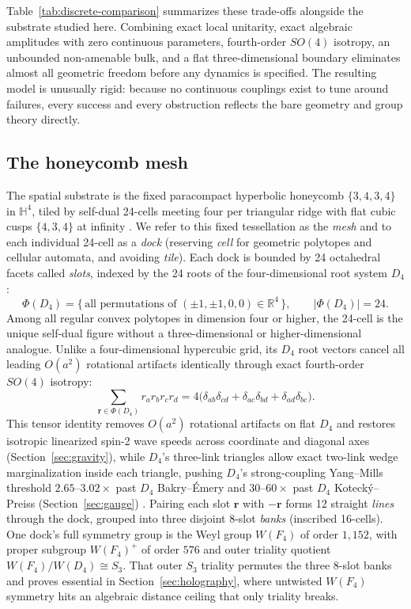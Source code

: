 Table~\ref{tab:discrete-comparison} summarizes these trade-offs alongside the substrate studied here. Combining exact
local unitarity, exact algebraic amplitudes with zero continuous parameters, fourth-order $SO(4)$ isotropy, an
unbounded non-amenable bulk, and a flat three-dimensional boundary eliminates almost all geometric freedom before any
dynamics is specified. The resulting model is unusually rigid: because no continuous couplings exist to tune around
failures, every success and every obstruction reflects the bare geometry and group theory directly.

\subsection{The honeycomb mesh}

The spatial substrate is the fixed paracompact hyperbolic honeycomb $\{3,4,3,4\}$ in $\mathbb{H}^4$, tiled by self-dual
24-cells meeting four per triangular ridge with flat cubic cusps $\{4,3,4\}$ at infinity \cite{coxeter1956,
coxeter1973}. We refer to this fixed tessellation as the \emph{mesh} and to each individual 24-cell as a \emph{dock}
(reserving \emph{cell} for geometric polytopes and cellular automata, and avoiding \emph{tile}). Each dock is bounded by
24 octahedral facets called \emph{slots}, indexed by the 24 roots of the four-dimensional root system $D_4$
\cite{conway1999}:
\begin{equation}
\Phi(D_4) = \bigl\{\,\text{all permutations of } (\pm 1, \pm 1, 0, 0) \in \mathbb{R}^4\,\bigr\},
\qquad
|\Phi(D_4)| = 24.
\label{eq:d4-roots}
\end{equation}
Among all regular convex polytopes in dimension four or higher, the 24-cell is the unique self-dual figure without a
three-dimensional or higher-dimensional analogue. Unlike a four-dimensional hypercubic grid, its $D_4$ root vectors
cancel all leading $O(a^2)$ rotational artifacts identically through exact fourth-order $SO(4)$ isotropy:
\begin{equation}
\sum_{\mathbf{r} \in \Phi(D_4)} r_a r_b r_c r_d
= 4\bigl(\delta_{ab}\delta_{cd} + \delta_{ac}\delta_{bd} + \delta_{ad}\delta_{bc}\bigr).
\label{eq:d4-isotropy}
\end{equation}
This tensor identity removes $O(a^2)$ rotational artifacts on flat $D_4$ and restores isotropic linearized spin-2 wave
speeds across coordinate and diagonal axes (Section~\ref{sec:gravity}), while $D_4$'s three-link triangles allow exact
two-link wedge marginalization inside each triangle, pushing $D_4$'s strong-coupling Yang--Mills threshold
$2.65\text{--}3.02\times$ past $D_4$ Bakry--\'Emery and $30\text{--}60\times$ past $D_4$ Koteck\'y--Preiss
(Section~\ref{sec:gauge}) \cite{celmaster1982}. Pairing each slot $\mathbf{r}$ with $-\mathbf{r}$ forms 12 straight
\emph{lines} through the dock, grouped into three disjoint 8-slot \emph{banks} (inscribed 16-cells). One dock's full
symmetry group is the Weyl group $W(F_4)$ of order $1{,}152$, with proper subgroup $W(F_4)^+$ of order $576$ and outer
triality quotient $W(F_4) / W(D_4) \cong S_3$. That outer $S_3$ triality permutes the three 8-slot banks and proves
essential in Section~\ref{sec:holography}, where untwisted $W(F_4)$ symmetry hits an algebraic distance ceiling that
only triality breaks.

